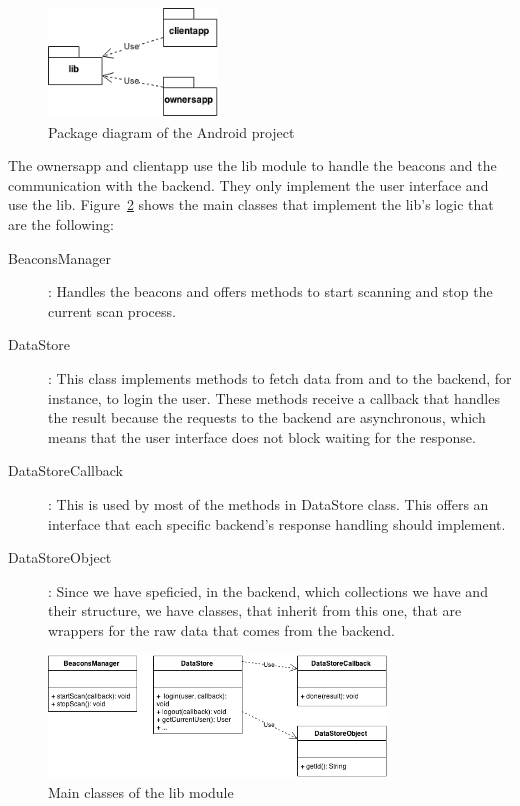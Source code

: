 \begin{figure}[!ht]
  \centering
    \includegraphics[width=0.4\textwidth]{figures/package_diagram_android}
    \caption{Package diagram of the Android project}
    \label{fig:package_diagram_android}
\end{figure}

The ownersapp and clientapp use the lib module to handle the beacons and
the communication with the backend. They only implement the user interface
and use the lib. Figure~\ref{fig:android-uml} shows the main classes
that implement the lib's logic that are the following:
\begin{description}
  \item[BeaconsManager]: Handles the beacons and offers methods to
  start scanning and stop the current scan process.
  \item[DataStore]: This class implements methods to fetch data from and to
  the backend, for instance, to login the user. These methods receive a callback
  that handles the result because the requests to the backend are asynchronous,
  which means that the user interface does not block waiting for the
  response.
  \item[DataStoreCallback]: This is used by most of the methods in DataStore
  class. This offers an interface that each specific backend's response
  handling should implement.
  \item[DataStoreObject]: Since we have speficied, in the backend, which
  collections we have and their structure, we have classes, that inherit from
  this one, that are wrappers for the raw data that comes from the backend.
\end{description}

\begin{figure}[!ht]
  \centering
    \includegraphics[width=0.8\textwidth]{figures/android-uml}
    \caption{Main classes of the lib module}
    \label{fig:android-uml}
\end{figure}

